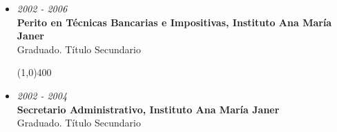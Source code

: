 \begin{itemize}
\item \begin{large}\textit{2002 - 2006}\\
	   \textbf{Perito en Técnicas Bancarias e Impositivas, Instituto Ana María Janer}\\
	   Graduado. Título Secundario
	    \end{large}
	    
\begin{center}
\line(1,0){400}
\end{center}
	    
\item \begin{large}\textit{2002 - 2004}\\
	   \textbf{Secretario Administrativo, Instituto Ana María Janer}\\
	   Graduado. Título Secundario
	    \end{large}
\end{itemize}


